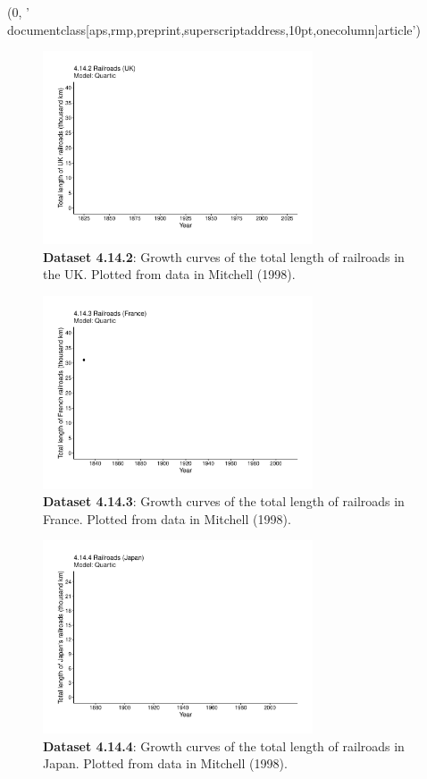 (0, '\\documentclass[aps,rmp,preprint,superscriptaddress,10pt,onecolumn]{article}\n')
\begin{document}
\begin{figure}[h]
\includegraphics[width=8cm]{output/figs-ggplot/4.14.2.pdf}
\caption{\textbf{Dataset 4.14.2}: Growth curves of the total length of railroads in the UK. Plotted from data in Mitchell (1998).}
\end{figure}
	
\begin{figure}[h]
\includegraphics[width=8cm]{output/figs-ggplot/4.14.3.pdf}
\caption{\textbf{Dataset 4.14.3}: Growth curves of the total length of railroads in France. Plotted from data in Mitchell (1998).}
\end{figure}
	
\begin{figure}[h]
\includegraphics[width=8cm]{output/figs-ggplot/4.14.4.pdf}
\caption{\textbf{Dataset 4.14.4}: Growth curves of the total length of railroads in Japan. Plotted from data in Mitchell (1998).}
\end{figure}
	
\end{document}
